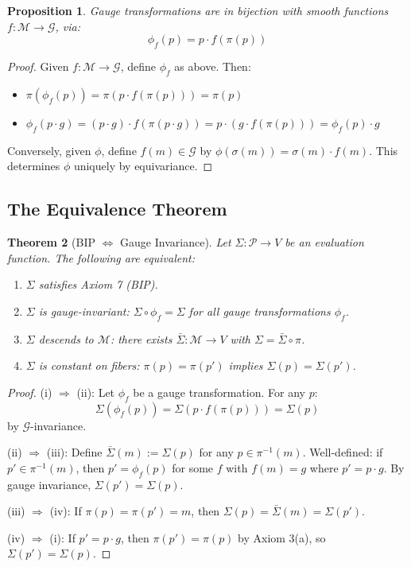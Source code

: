 \documentclass[11pt]{article}
\newtheorem{theorem}{Theorem}[section]
\newtheorem{proposition}[theorem]{Proposition}
\begin{document}
\begin{proposition}
Gauge transformations are in bijection with smooth functions $f : \mathcal{M} \to \mathcal{G}$,
via:
\[
\phi_f(p) = p \cdot f(\pi(p))
\]
\end{proposition}

\begin{proof}
Given $f : \mathcal{M} \to \mathcal{G}$, define $\phi_f$ as above. Then:
\begin{itemize}
    \item $\pi(\phi_f(p)) = \pi(p \cdot f(\pi(p))) = \pi(p)$
    \item $\phi_f(p \cdot g) = (p \cdot g) \cdot f(\pi(p \cdot g)) = p \cdot (g \cdot f(\pi(p))) = \phi_f(p) \cdot g$
\end{itemize}
Conversely, given $\phi$, define $f(m) \in \mathcal{G}$ by $\phi(\sigma(m)) = \sigma(m) \cdot f(m)$. This determines $\phi$ uniquely
by equivariance.
\end{proof}

\subsection{The Equivalence Theorem}

\begin{theorem}[BIP $\Leftrightarrow$ Gauge Invariance]
\label{thm:equivalence}
Let $\Sigma : \mathcal{P} \to V$ be an evaluation function. The
following are equivalent:
\begin{enumerate}
    \item[(i)] $\Sigma$ satisfies Axiom 7 (BIP).
    \item[(ii)] $\Sigma$ is gauge-invariant: $\Sigma \circ \phi_f = \Sigma$ for all gauge transformations $\phi_f$.
    \item[(iii)] $\Sigma$ descends to $\mathcal{M}$: there exists $\bar{\Sigma} : \mathcal{M} \to V$ with $\Sigma = \bar{\Sigma} \circ \pi$.
    \item[(iv)] $\Sigma$ is constant on fibers: $\pi(p) = \pi(p')$ implies $\Sigma(p) = \Sigma(p')$.
\end{enumerate}
\end{theorem}

\begin{proof}
(i) $\Rightarrow$ (ii): Let $\phi_f$ be a gauge transformation. For any $p$:
\[
\Sigma(\phi_f(p)) = \Sigma(p \cdot f(\pi(p))) = \Sigma(p)
\]
by $\mathcal{G}$-invariance.

(ii) $\Rightarrow$ (iii): Define $\bar{\Sigma}(m) := \Sigma(p)$ for any $p \in \pi^{-1}(m)$. Well-defined: if $p' \in \pi^{-1}(m)$, then
$p' = \phi_f(p)$ for some $f$ with $f(m) = g$ where $p' = p \cdot g$. By gauge invariance, $\Sigma(p') = \Sigma(p)$.

(iii) $\Rightarrow$ (iv): If $\pi(p) = \pi(p') = m$, then $\Sigma(p) = \bar{\Sigma}(m) = \Sigma(p')$.

(iv) $\Rightarrow$ (i): If $p' = p \cdot g$, then $\pi(p') = \pi(p)$ by Axiom 3(a), so $\Sigma(p') = \Sigma(p)$.
\end{proof}
\end{document}
